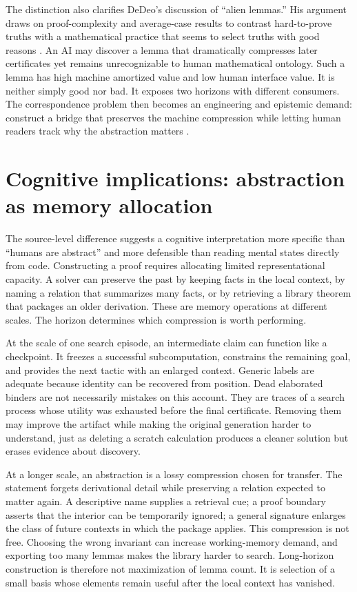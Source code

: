 \documentclass[10pt]{article}
\begin{document}
The distinction also clarifies DeDeo's discussion of ``alien lemmas.''  His argument draws on
proof-complexity and average-case results to contrast hard-to-prove truths with a mathematical
practice that seems to select truths with good reasons \citep{dedeo2024hard}.  An AI may discover a lemma that dramatically
compresses later certificates yet remains unrecognizable to human mathematical ontology.  Such a
lemma has high machine amortized value and low human interface value.  It is neither simply good nor
bad.  It exposes two horizons with different consumers.  The correspondence problem then becomes an
engineering and epistemic demand: construct a bridge that preserves the machine compression while
letting human readers track why the abstraction matters \citep{dedeo2023aleph,
dedeo2026correspondence}.

\section{Cognitive implications: abstraction as memory allocation}

The source-level difference suggests a cognitive interpretation more specific than ``humans are
abstract'' and more defensible than reading mental states directly from code.  Constructing a proof
requires allocating limited representational capacity.  A solver can preserve the past by keeping
facts in the local context, by naming a relation that summarizes many facts, or by retrieving a
library theorem that packages an older derivation.  These are memory operations at different
scales.  The horizon determines which compression is worth performing.

At the scale of one search episode, an intermediate claim can function like a checkpoint.  It
freezes a successful subcomputation, constrains the remaining goal, and provides the next tactic
with an enlarged context.  Generic labels are adequate because identity can be recovered from
position.  Dead elaborated binders are not necessarily mistakes on this account.  They are traces
of a search process whose utility was exhausted before the final certificate.  Removing them may
improve the artifact while making the original generation harder to understand, just as deleting a
scratch calculation produces a cleaner solution but erases evidence about discovery.

At a longer scale, an abstraction is a lossy compression chosen for transfer.  The statement
forgets derivational detail while preserving a relation expected to matter again.  A descriptive
name supplies a retrieval cue; a proof boundary asserts that the interior can be temporarily
ignored; a general signature enlarges the class of future contexts in which the package applies.
This compression is not free.  Choosing the wrong invariant can increase working-memory demand,
and exporting too many lemmas makes the library harder to search.  Long-horizon construction is
therefore not maximization of lemma count.  It is selection of a small basis whose elements remain
useful after the local context has vanished.
\end{document}
